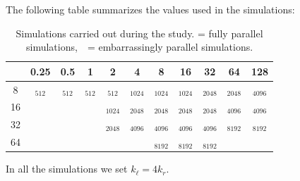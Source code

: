 \documentclass{beamer} %
\begin{document}
\begin{frame}
	The following table summarizes the values used in the simulations:

	\begin{table}[ht]
		\centering
		\def\tickgreen{\textcolor{color_green3}{\ding{51}}}
		\def\tickblue{\textcolor{color_blue3}{\ding{51}}}
		\setlength{\tabcolsep}{3pt}
		\renewcommand{\arraystretch}{1.5}
		{\fontsize{8pt}{10pt}
			\begin{tabular}{c|cccccccccc}
				\diagbox[width=\dimexpr \textwidth/16+2\tabcolsep\relax, height=1cm]{$k_r$}{$\Re$} & 0.25               & 0.5                & 1                  & 2                           & 4                            & 8                            & 16                           & 32                           & 64                  & 128                 \\\hline
				8                                                                                  & \tickgreen$_{512}$ & \tickgreen$_{512}$ & \tickgreen$_{512}$ & \tickgreen\tickblue$_{512}$ & \tickgreen\tickblue$_{1024}$ & \tickgreen\tickblue$_{1024}$ & \tickgreen\tickblue$_{1024}$ & \tickgreen\tickblue$_{2048}$ & \tickgreen$_{2048}$ & \tickgreen$_{4096}$ \\
				16                                                                                 &                    &                    &                    & \tickblue$_{1024}$          & \tickblue$_{2048}$           & \tickgreen\tickblue$_{2048}$ & \tickgreen\tickblue$_{2048}$ & \tickgreen\tickblue$_{2048}$ & \tickgreen$_{4096}$ & \tickgreen$_{4096}$ \\
				32                                                                                 &                    &                    &                    & \tickblue$_{2048}$          & \tickblue$_{4096}$           & \tickgreen\tickblue$_{4096}$ & \tickgreen\tickblue$_{4096}$ & \tickgreen\tickblue$_{4096}$ & \tickgreen$_{8192}$ & \tickgreen$_{8192}$ \\
				64                                                                                 &                    &                    &                    &                             &                              & \tickgreen$_{8192}$          & \tickgreen$_{8192}$          & \tickgreen$_{8192}$          &                     &                     \\
			\end{tabular}}
		\caption{Simulations carried out during the study. \tickgreen = fully parallel simulations,\ \  \tickblue = embarrassingly parallel simulations.}\label{tab:simulations}
	\end{table}

	In all the simulations we set $k_\ell = 4 k_r$.
\end{frame}
\end{document}

